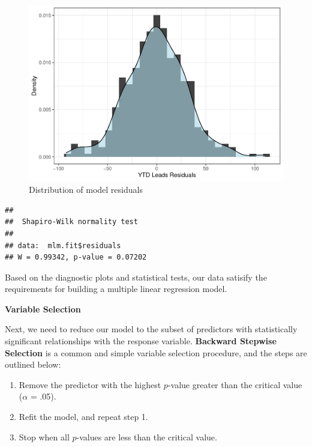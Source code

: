 \documentclass[
]{book}
\newenvironment{Shaded}{\begin{snugshade}}{\end{snugshade}}
\newcommand{\CommentTok}[1]{\textcolor[rgb]{0.56,0.35,0.01}{\textit{#1}}}
\newcommand{\FunctionTok}[1]{\textcolor[rgb]{0.00,0.00,0.00}{#1}}
\newcommand{\NormalTok}[1]{#1}
\newcommand{\SpecialCharTok}[1]{\textcolor[rgb]{0.00,0.00,0.00}{#1}}
\providecommand{\tightlist}{%
  \setlength{\itemsep}{0pt}\setlength{\parskip}{0pt}}
\begin{document}
\begin{figure}

{\centering \includegraphics{People_Analytics_Lifecycle_files/figure-latex/mlm-residuals-1} 

}

\caption{Distribution of model residuals}\label{fig:mlm-residuals}
\end{figure}

\begin{Shaded}
\end{Shaded}

\begin{verbatim}
## 
##  Shapiro-Wilk normality test
## 
## data:  mlm.fit$residuals
## W = 0.99342, p-value = 0.07202
\end{verbatim}

Based on the diagnostic plots and statistical tests, our data satisify the requirements for building a multiple linear regression model.

\textbf{Variable Selection}

Next, we need to reduce our model to the subset of predictors with statistically significant relationships with the response variable. \textbf{Backward Stepwise Selection} is a common and simple variable selection procedure, and the steps are outlined below:

\begin{enumerate}
\def\labelenumi{\arabic{enumi}.}
\tightlist
\item
  Remove the predictor with the highest \(p\)-value greater than the critical value (\(\alpha\) = .05).
\item
  Refit the model, and repeat step 1.
\item
  Stop when all \(p\)-values are less than the critical value.
\end{enumerate}
\end{document}
